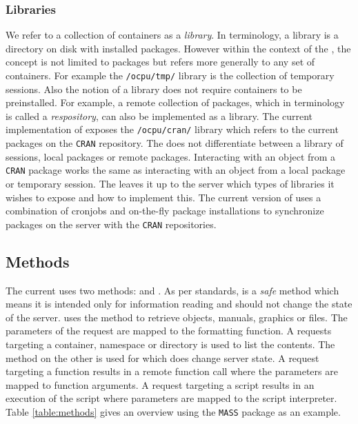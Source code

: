 \subsubsection{Libraries}

We refer to a collection of containers as a \emph{library}. In \R terminology, a library is a directory on disk with installed packages. However within the context of the \API, the concept is not limited to packages but refers more generally to any set of containers. For example the \texttt{/ocpu/tmp/} library is the collection of temporary sessions. Also the \API notion of a library does not require containers to be preinstalled. For example, a remote collection of packages, which in \R terminology is called a \emph{respository}, can also be implemented as a library. The current implementation of \OpenCPU exposes the \texttt{/ocpu/cran/} library which refers to the current packages on the \texttt{CRAN} repository. The \API does not differentiate between a library of sessions, local packages or remote packages. Interacting with an object from a \texttt{CRAN} package works the same as interacting with an object from a local package or temporary session. The \API leaves it up to the server which types of libraries it wishes to expose and how to implement this. The current version of \OpenCPU uses a combination of cronjobs and on-the-fly package installations to synchronize packages on the server with the \texttt{CRAN} repositories.


\subsection{Methods}

The current \API uses two \HTTP methods: \GET and \POST. As per \HTTP standards, \GET is a \emph{safe} method which means it is intended only for information reading and should not change the state of the server. \OpenCPU uses the \GET method to retrieve objects, manuals, graphics or files. The parameters of the request are mapped to the formatting function. A \GET requests targeting a container, namespace or directory is used to list the contents. The \POST method on the other is used for \RPC which does change server state. A \POST request targeting a function results in a remote function call where the \HTTP parameters are mapped to function arguments. A \POST request targeting a script results in an execution of the script where \HTTP parameters are mapped to the script interpreter. Table \ref{table:methods} gives an overview using the \texttt{MASS} package \citep{MASS} as an example.

